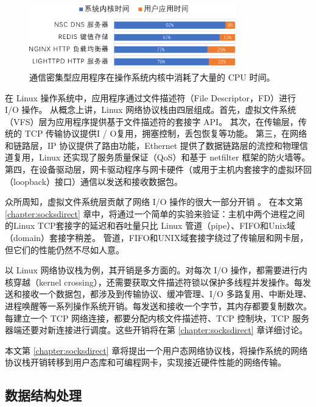 \begin{figure}[htbp]
	\centering
	\includegraphics[width=0.8\textwidth]{figures/kernel_time.pdf}
	\caption{通信密集型应用程序在操作系统内核中消耗了大量的 CPU 时间。}
	\label{background:fig:kernel_time}
\end{figure}

在 Linux 操作系统中，应用程序通过文件描述符（File Descriptor，FD）进行 I/O 操作。
从概念上讲，Linux 网络协议栈由四层组成。首先，虚拟文件系统（VFS）层为应用程序提供基于文件描述符的套接字 API。
其次，在传输层，传统的 TCP 传输协议提供I / O复用，拥塞控制，丢包恢复等功能。
第三，在网络和链路层，IP 协议提供了路由功能，Ethernet 提供了数据链路层的流控和物理信道复用，Linux 还实现了服务质量保证（QoS）和基于 netfilter 框架的防火墙等。
第四，在设备驱动层，网卡驱动程序与网卡硬件（或用于主机内套接字的虚拟环回（loopback）接口）通信以发送和接收数据包。

众所周知，虚拟文件系统层贡献了网络 I/O 操作的很大一部分开销 \cite {clark1989analysis,boyd2010analysis}。
在本文第 \ref{chapter:socksdirect} 章中，将通过一个简单的实验来验证：主机中两个进程之间的Linux TCP套接字的延迟和吞吐量只比 Linux 管道（pipe）、FIFO和Unix域（domain）套接字稍差。
管道，FIFO和UNIX域套接字绕过了传输层和网卡层，但它们的性能仍然不尽如人意。

以 Linux 网络协议栈为例，其开销是多方面的。对每次 I/O 操作，都需要进行内核穿越（kernel crossing），还需要获取文件描述符锁以保护多线程并发操作。每发送和接收一个数据包，都涉及到传输协议、缓冲管理、I/O 多路复用、中断处理、进程唤醒等一系列操作系统开销。每发送和接收一个字节，其内存都要复制数次。每建立一个 TCP 网络连接，都要分配内核文件描述符、TCP 控制块，TCP 服务器端还要对新连接进行调度。这些开销将在第 \ref{chapter:socksdirect} 章详细讨论。

本文第 \ref{chapter:socksdirect} 章将提出一个用户态网络协议栈，将操作系统的网络协议栈开销转移到用户态库和可编程网卡，实现接近硬件性能的网络传输。

\subsection{数据结构处理}



